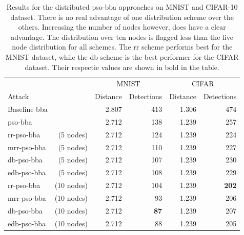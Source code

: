 \begin{table}
	\centering
	\caption[Distributed PSO-BBA results]{Results for the distributed \gls{pso}-\gls{bba} approaches on MNIST and CIFAR-10 dataset. There is no real advantage of one distribution scheme over the others. Increasing the number of nodes however, does have a clear advantage. The distribution over ten nodes is flagged less than the five node distribution for all schemes. The \gls{rr} scheme performs best for the MNIST dataset, while the \gls{db} scheme is the best performer for the CIFAR dataset. Their respectie values are shown in bold in the table.}
	\label{tbl:d_pso_bba}
	\begin{tabular}{lrrrrr}\toprule
			&& \multicolumn{2}{c}{MNIST} &\multicolumn{2}{c}{CIFAR} \\ \cmidrule(r){3-4} \cmidrule(r){5-6}
	Attack				&&Distance	&Detections	&Distance	&Detections \\ \midrule
	Baseline \gls{bba}							&&2.807	&413	&1.306	&474 \\
	\gls{pso}-\gls{bba} 						&&2.712	&138	&1.239	&257 \\ \addlinespace[\linespace] 
	\gls{rr}-\gls{pso}-\gls{bba} &(5 nodes) 		&2.712	&124	&1.239	&224 \\
	\gls{mrr}-\gls{pso}-\gls{bba} &(5 nodes)		&2.712	&110	&1.239	&227 \\
	\gls{db}-\gls{pso}-\gls{bba} &(5 nodes)		&2.712	&107	&1.239	&230 \\
	\gls{edb}-\gls{pso}-\gls{bba} &(5 nodes)		&2.712	&108	&1.239	&229 \\ \addlinespace[\linespace] 
	\gls{rr}-\gls{pso}-\gls{bba} &(10 nodes) 	&2.712	&104	&1.239	&\textbf{202} \\
	\gls{mrr}-\gls{pso}-\gls{bba} &(10 nodes)	&2.712	&93		&1.239	&206 \\
	\gls{db}-\gls{pso}-\gls{bba} &(10 nodes)		&2.712	&\textbf{87}		&1.239	&207 \\
	\gls{edb}-\gls{pso}-\gls{bba} &(10 nodes)	&2.712	&88		&1.239	&205 \\
	\bottomrule
	\end{tabular}
\end{table}

